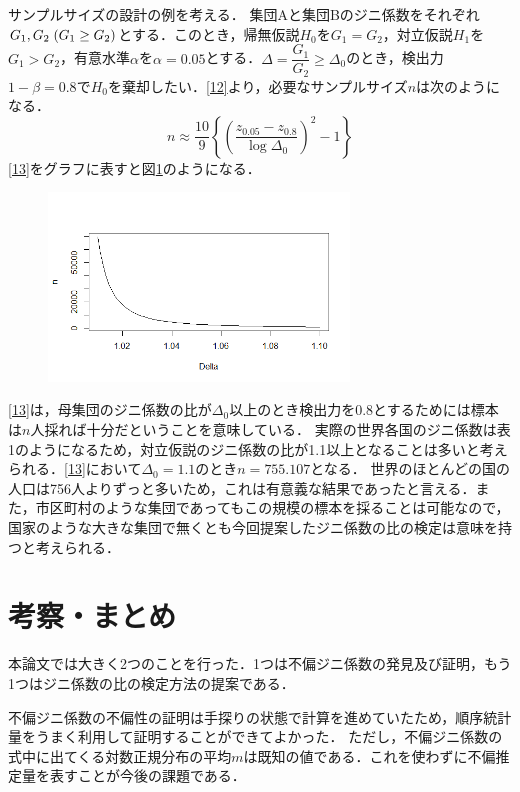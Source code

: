 \documentclass{jsarticle}
\begin{document}
サンプルサイズの設計の例を考える．
集団Aと集団Bのジニ係数をそれぞれ$G_1,G_2 \hspace{1mm} (G_1 \geq G_2)$とする．このとき，帰無仮説$H_0$を$G_1=G_2$，対立仮説$H_1$を$G_1>G_2$，有意水準$\alpha$を$\alpha=0.05$とする．$\Delta=\dfrac{G_1}{G_2} \geq \Delta_0$のとき，検出力$1-\beta=0.8$で$H_0$を棄却したい．\eqref{12}より，必要なサンプルサイズ$n$は次のようになる．
\begin{equation}
n \approx \frac{10}{9} \left\{ \left( \frac{z_{0.05}-z_{0.8}}{\log \Delta_0} \right)^2-1 \right\} \label{13}
\end{equation}
\eqref{13}をグラフに表すと図\ref{sizecurve}のようになる．
\begin{figure}[htbp]
\centering
\includegraphics[width=8cm]{figure5}
\caption{}
\label{sizecurve}
\end{figure}

\eqref{13}は，母集団のジニ係数の比が$\Delta_0$以上のとき検出力を0.8とするためには標本は$n$人採れば十分だということを意味している．
実際の世界各国のジニ係数は表1のようになるため，対立仮説のジニ係数の比が1.1以上となることは多いと考えられる．\eqref{13}において$\Delta_0=1.1$のとき$n=755.107$となる．
世界のほとんどの国の人口は756人よりずっと多いため，これは有意義な結果であったと言える．また，市区町村のような集団であってもこの規模の標本を採ることは可能なので，国家のような大きな集団で無くとも今回提案したジニ係数の比の検定は意味を持つと考えられる．


\section{考察・まとめ}
本論文では大きく2つのことを行った．1つは不偏ジニ係数の発見及び証明，もう1つはジニ係数の比の検定方法の提案である．

不偏ジニ係数の不偏性の証明は手探りの状態で計算を進めていたため，順序統計量をうまく利用して証明することができてよかった．
ただし，不偏ジニ係数の式中に出てくる対数正規分布の平均$m$は既知の値である．これを使わずに不偏推定量を表すことが今後の課題である．
\end{document}
